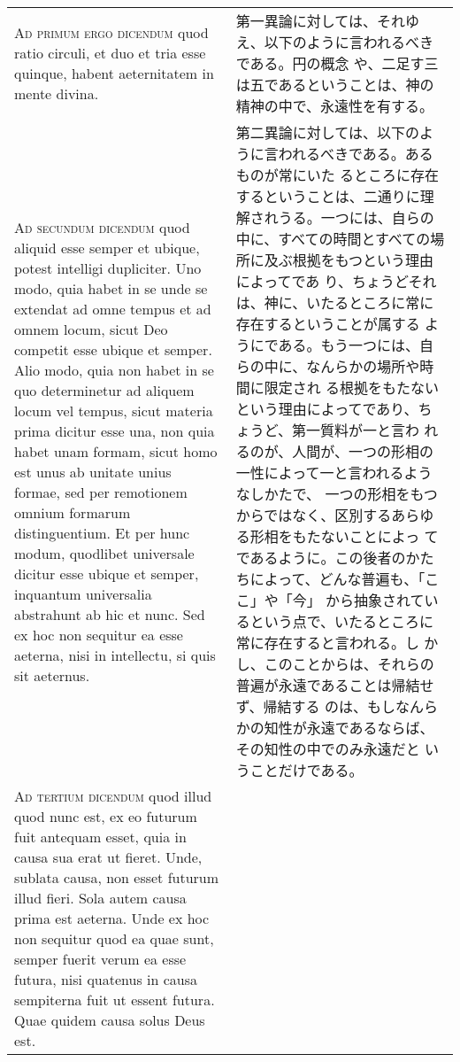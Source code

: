 \documentclass[10pt]{jsarticle} %
\begin{document}
\begin{longtable}{p{21em}p{21em}}
\\


{\scshape Ad primum ergo dicendum} quod ratio circuli, et duo et tria
esse quinque, habent aeternitatem in mente divina.

&

第一異論に対しては、それゆえ、以下のように言われるべきである。円の概念
や、二足す三は五であるということは、神の精神の中で、永遠性を有する。


\\

{\scshape Ad secundum dicendum} quod aliquid esse semper et ubique,
potest intelligi dupliciter. Uno modo, quia habet in se unde se
extendat ad omne tempus et ad omnem locum, sicut Deo competit esse
ubique et semper. Alio modo, quia non habet in se quo determinetur ad
aliquem locum vel tempus, sicut materia prima dicitur esse una, non
quia habet unam formam, sicut homo est unus ab unitate unius formae,
sed per remotionem omnium formarum distinguentium. Et per hunc modum,
quodlibet universale dicitur esse ubique et semper, inquantum
universalia abstrahunt ab hic et nunc. Sed ex hoc non sequitur ea esse
aeterna, nisi in intellectu, si quis sit aeternus.

&

第二異論に対しては、以下のように言われるべきである。あるものが常にいた
るところに存在するということは、二通りに理解されうる。一つには、自らの
中に、すべての時間とすべての場所に及ぶ根拠をもつという理由によってであ
り、ちょうどそれは、神に、いたるところに常に存在するということが属する
ようにである。もう一つには、自らの中に、なんらかの場所や時間に限定され
る根拠をもたないという理由によってであり、ちょうど、第一質料が一と言わ
れるのが、人間が、一つの形相の一性によって一と言われるようなしかたで、
一つの形相をもつからではなく、区別するあらゆる形相をもたないことによっ
てであるように。この後者のかたちによって、どんな普遍も、「ここ」や「今」
から抽象されているという点で、いたるところに常に存在すると言われる。し
かし、このことからは、それらの普遍が永遠であることは帰結せず、帰結する
のは、もしなんらかの知性が永遠であるならば、その知性の中でのみ永遠だと
いうことだけである。


\\

{\scshape Ad tertium dicendum} quod illud quod nunc est, ex eo futurum
fuit antequam esset, quia in causa sua erat ut fieret. Unde, sublata
causa, non esset futurum illud fieri. Sola autem causa prima est
aeterna. Unde ex hoc non sequitur quod ea quae sunt, semper fuerit
verum ea esse futura, nisi quatenus in causa sempiterna fuit ut essent
futura. Quae quidem causa solus Deus est.


\end{longtable}
\end{document}
